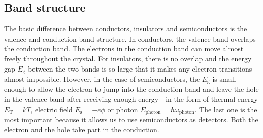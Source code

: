  
 


\subsection{Band structure}
The basic difference between conductors, insulators and semiconductors is the valence and conduction band structure. In conductors, the valence band overlaps the conduction band. The electrons in the conduction band can move almost freely throughout the crystal. For insulators, there is no overlap and the energy gap $E_{\textrm{g}}$ between the two bands is so large that it makes any electron transitions almost impossible. However, in the case of semiconductors, the $E_{\textrm{g}}$ is small enough to allow the electron to jump into the conduction band and leave the hole in the valence band after receiving enough energy - in the form of thermal energy $E_{\textrm{T}} = kT$, electric field $E_{\textrm{s}} = -e\phi$ or photon $E_{\textrm{photon}} = \hbar \omega_{\textrm{photon}}$. The last one is the most important because it allows us to use semiconductors as detectors. Both the electron and the hole take part in the conduction.


